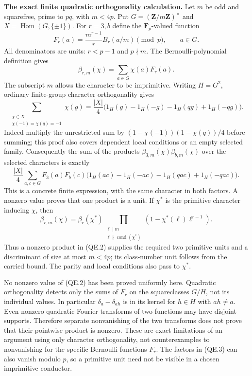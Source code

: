 \documentclass[11pt,a4paper]{article}
\theoremstyle{definition}
\renewcommand{\paragraph}[1]{\par\smallskip\noindent\textbf{#1}\quad\ignorespaces}
\begin{document}
\paragraph{The exact finite quadratic orthogonality calculation.}
Let $m$ be odd and squarefree, prime to $pq$, with $m<4p$.
Put $G=(\mathbf Z/m\mathbf Z)^\times$ and
$X=\operatorname{Hom}(G,\{\pm1\})$.  For $r=3,b$ define the
$\mathbf F_p$-valued function
\[
 F_r(a)=\frac{m^{r-1}}r B_r(a/m)\pmod p,\qquad a\in G.
\]
All denominators are units: $r<p-1$ and $p\nmid m$.
The Bernoulli-polynomial definition gives
\[
 \beta_{r,m}(\chi)=\sum_{a\in G}\chi(a)F_r(a).
\]
The subscript $m$ allows the character to be imprimitive.
Writing $H=G^2$, ordinary finite-group character orthogonality gives
\[
 \sum_{\substack{\chi\in X\\\chi(-1)=\chi(q)=-1}}\chi(g)
 =\frac{|X|}{4}
  \bigl(1_H(g)-1_H(-g)-1_H(qg)+1_H(-qg)\bigr).
 \tag{QE.1}
\]
Indeed multiply the unrestricted sum by
$(1-\chi(-1))(1-\chi(q))/4$ before summing; this proof also
covers dependent local conditions or an empty selected family.
Consequently the sum of the products
$\beta_{3,m}(\chi)\beta_{b,m}(\chi)$ over the selected characters
is exactly
\[
 \frac{|X|}{4}\sum_{a,c\in G}F_3(a)F_b(c)
  \bigl(1_H(ac)-1_H(-ac)-1_H(qac)+1_H(-qac)\bigr).
 \tag{QE.2}
\]
This is a concrete finite expression, with the same character in
both factors.  A nonzero value proves that one product is a unit.
If $\chi^*$ is the primitive character inducing $\chi$, then
\[
 \beta_{r,m}(\chi)=\beta_r(\chi^*)
  \prod_{\substack{\ell\mid m\\\ell\nmid\operatorname{cond}(\chi^*)}}
       (1-\chi^*(\ell)\ell^{r-1}).
 \tag{QE.3}
\]
Thus a nonzero product in (QE.2) supplies the required two primitive
units and a discriminant of size at most $m<4p$; its class-number
unit follows from the carried bound.  The parity and local
conditions also pass to $\chi^*$.

No nonzero value of (QE.2) has been proved uniformly here.
Quadratic orthogonality detects only the sums of $F_r$ on the
squareclasses $G/H$, not its individual values.  In particular
$\delta_a-\delta_{ah}$ is in its kernel for $h\in H$ with
$ah\ne a$.  Even nonzero quadratic Fourier transforms of two
functions may have disjoint supports.  Therefore separate
nonvanishing of the two transforms does not prove that their
pointwise product is nonzero.  These are exact limitations of an
argument using only character orthogonality, not counterexamples
to nonvanishing for the specific Bernoulli functions $F_r$.
The factors in (QE.3) can also vanish modulo $p$, so a primitive
unit need not be visible in a chosen imprimitive conductor.
\end{document}
